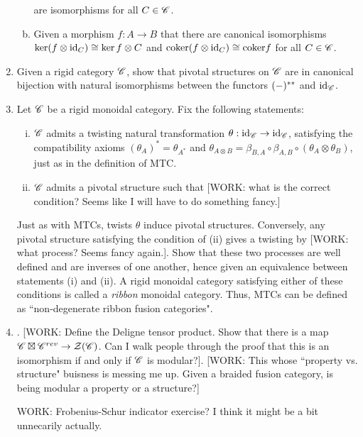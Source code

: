\documentclass{article}
\theoremstyle{definition}
\numberwithin{figure}{section}
\begin{document}
\begin{enumerate}[\thesection .1.]
\begin{enumerate}[(a)]
are isomorphisms for all $C\in \mathscr{C}$.

\item Given a morphism $f:A\to B$ that there are canonical isomorphisms $\ker (f\otimes \mathrm{id}_C)\cong \ker f\otimes C$ and $\mathrm{coker} (f\otimes \mathrm{id}_C)\cong \mathrm{coker} f$ for all $C\in \mathscr{C}$.
\end{enumerate}

\item Given a rigid category $\mathscr{C}$, show that pivotal structures on $\mathscr{C}$ are in canonical bijection with natural isomorphisms between the functors $(\--)^{**}$ and $\mathrm{id}_{\mathscr{C}}$.

\item Let $\mathscr{C}$ be a rigid monoidal category. Fix the following statements:

\begin{enumerate}[(i)]
\item $\mathscr{C}$ admits a twisting natural transformation $\theta:\mathrm{id}_{\mathscr{C}}\to \mathrm{id}_{\mathscr{C}}$, satisfying the compatibility axioms $(\theta_A)^{*}=\theta_{A^*}$ and $\theta_{A\otimes B}=\beta_{B,A}\circ \beta_{A,B}\circ (\theta_{A}\otimes \theta_{B})$, just as in the definition of MTC.

\item $\mathscr{C}$ admits a pivotal structure such that [WORK: what is the correct condition? Seems like I will have to do something fancy.]
\end{enumerate}

Just as with MTCs, twists $\theta$ induce pivotal structures. Conversely, any pivotal structure satisfying the condition of (ii) gives a twisting by [WORK: what process? Seems fancy again.]. Show that these two processes are well defined and are inverses of one another, hence given an equivalence between statements (i) and (ii). A rigid monoidal category satisfying either of these conditions is called a \textit{ribbon} monoidal category. Thus, MTCs can be defined as ``non-degenerate ribbon fusion categories".

\item . [WORK: Define the Deligne tensor product. Show that there is a map $\mathscr{C}\boxtimes \mathscr{C}^{rev}\to \mathcal{Z}(\mathscr{C})$. Can I walk people through the proof that this is an isomorphism if and only if $\mathscr{C}$ is modular?]. [WORK: This whose ``property vs. structure" buisness is messing me up. Given a braided fusion category, is being modular a property or a structure?]

\item [WORK: Frobenius-Schur indicator exercise? I think it might be a bit unnecarily actually.]

\end{enumerate}
\end{document}
